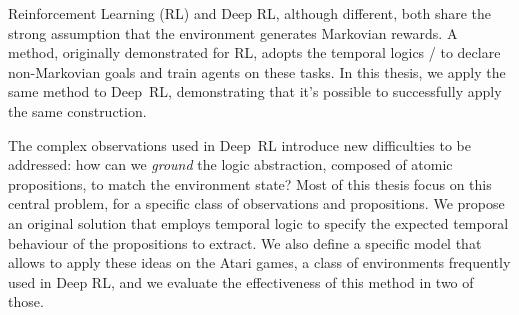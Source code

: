 Reinforcement Learning (RL) and Deep RL, although different, both share the
strong assumption that the environment generates Markovian rewards. A method,
originally demonstrated for RL, adopts the temporal logics \ltl{}/\ldl{} to
declare non-Markovian goals and train agents on these tasks. In this thesis,
we apply the same method to Deep~RL, demonstrating that it's possible to
successfully apply the same construction.

The complex observations used in Deep~RL introduce new difficulties to be
addressed: how can we \emph{ground} the logic abstraction, composed of atomic
propositions, to match the environment state? Most of this thesis focus on
this central problem, for a specific class of observations and propositions.
We propose an original solution that employs temporal logic to specify the
expected temporal behaviour of the propositions to extract. We also define a
specific model that allows to apply these ideas on the Atari games, a class of
environments frequently used in Deep RL, and we evaluate the effectiveness of
this method in two of those.
